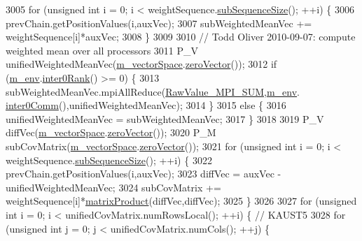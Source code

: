 \begin{DoxyCode}
3005       \textcolor{keywordflow}{for} (\textcolor{keywordtype}{unsigned} \textcolor{keywordtype}{int} i = 0; i < weightSequence.\hyperlink{class_q_u_e_s_o_1_1_scalar_sequence_a0288ea295eedc216a1617b3286f6f3a0}{subSequenceSize}(); ++i) \{
3006         prevChain.getPositionValues(i,auxVec);
3007         subWeightedMeanVec += weightSequence[i]*auxVec;
3008       \}
3009 
3010       \textcolor{comment}{// Todd Oliver 2010-09-07: compute weighted mean over all processors}
3011       P\_V unifiedWeightedMeanVec(\hyperlink{class_q_u_e_s_o_1_1_m_l_sampling_a7bc4c72f65ba9166ed94a6e198b0915b}{m\_vectorSpace}.\hyperlink{class_q_u_e_s_o_1_1_vector_space_a92e963bb5cab3eecd290dfe4b8f03b04}{zeroVector}());
3012       \textcolor{keywordflow}{if} (\hyperlink{class_q_u_e_s_o_1_1_m_l_sampling_a13f1ca4fe9f94822fe572a743eaced1d}{m\_env}.\hyperlink{class_q_u_e_s_o_1_1_base_environment_ae106b5bb8a80b655b88b3a26b1e7c185}{inter0Rank}() >= 0) \{
3013         subWeightedMeanVec.mpiAllReduce(\hyperlink{_mpi_comm_8h_afbf78d291c032aa7f512bc566cee2bd1}{RawValue\_MPI\_SUM},\hyperlink{class_q_u_e_s_o_1_1_m_l_sampling_a13f1ca4fe9f94822fe572a743eaced1d}{m\_env}.
      \hyperlink{class_q_u_e_s_o_1_1_base_environment_a689e4d140c74d495d97eb498714a4b82}{inter0Comm}(),unifiedWeightedMeanVec);
3014       \}
3015       \textcolor{keywordflow}{else} \{
3016         unifiedWeightedMeanVec = subWeightedMeanVec;
3017       \}
3018 
3019       P\_V diffVec(\hyperlink{class_q_u_e_s_o_1_1_m_l_sampling_a7bc4c72f65ba9166ed94a6e198b0915b}{m\_vectorSpace}.\hyperlink{class_q_u_e_s_o_1_1_vector_space_a92e963bb5cab3eecd290dfe4b8f03b04}{zeroVector}());
3020       P\_M subCovMatrix(\hyperlink{class_q_u_e_s_o_1_1_m_l_sampling_a7bc4c72f65ba9166ed94a6e198b0915b}{m\_vectorSpace}.\hyperlink{class_q_u_e_s_o_1_1_vector_space_a92e963bb5cab3eecd290dfe4b8f03b04}{zeroVector}());
3021       \textcolor{keywordflow}{for} (\textcolor{keywordtype}{unsigned} \textcolor{keywordtype}{int} i = 0; i < weightSequence.\hyperlink{class_q_u_e_s_o_1_1_scalar_sequence_a0288ea295eedc216a1617b3286f6f3a0}{subSequenceSize}(); ++i) \{
3022         prevChain.getPositionValues(i,auxVec);
3023         diffVec = auxVec - unifiedWeightedMeanVec;
3024         subCovMatrix += weightSequence[i]*\hyperlink{namespace_q_u_e_s_o_aea04e232d5d3dd76349a85bb8acf9e17}{matrixProduct}(diffVec,diffVec);
3025       \}
3026 
3027       \textcolor{keywordflow}{for} (\textcolor{keywordtype}{unsigned} \textcolor{keywordtype}{int} i = 0; i < unifiedCovMatrix.numRowsLocal(); ++i) \{ \textcolor{comment}{// KAUST5}
3028         \textcolor{keywordflow}{for} (\textcolor{keywordtype}{unsigned} \textcolor{keywordtype}{int} j = 0; j < unifiedCovMatrix.numCols(); ++j) \{

\end{DoxyCode}
